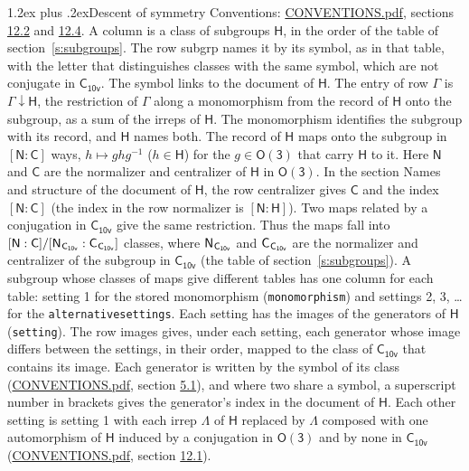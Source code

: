 \documentclass[10pt,a4paper]{article}
\makeatletter
\renewcommand\section{\@startsection{section}{1}{\z@}{-3ex plus -1ex minus -.2ex}%
  {1.2ex plus .2ex}{\normalfont\large\sffamily\bfseries\color{parttitle}}}
\numberwithin{equation}{section}
\newcommand{\grp}[1]{\mathsf{#1}}
\newcommand{\grpindex}[2]{[#1 : #2]}
\newcommand{\restr}[2]{#1\!\downarrow#2}
\newcommand{\hairsp}{\mkern1mu}
\makeatother
\begin{document}
\section{Descent of symmetry}\label{s:subduction}
Conventions: \href{../../CONVENTIONS.pdf}{CONVENTIONS.pdf}, sections \href{../../CONVENTIONS.pdf\#conv.12.2}{12.2} and \href{../../CONVENTIONS.pdf\#conv.12.4}{12.4}.
A column is a class of subgroups $\grp{H}$, in the order of the table of section~\ref{s:subgroups}. The row subgrp names it by its symbol, as in that table, with the letter that distinguishes classes with the same symbol, which are not conjugate in $\grp{C_{10v}}$. The symbol links to the document of $\grp{H}$. The entry of row $\Gamma$ is $\restr{\Gamma}{\grp{H}}$, the restriction of $\Gamma$ along a monomorphism from the record of $\grp{H}$ onto the subgroup, as a sum of the irreps of $\grp{H}$. The monomorphism identifies the subgroup with its record, and $\grp{H}$ names both. \label{n:group.normalizer.o3}\label{n:group.centralizer.o3}The record of $\grp{H}$ maps onto the subgroup in $\grpindex{\grp{N}}{\grp{C}}$ ways, $h \mapsto g h g^{-1}$ ($h \in \grp{H}$) for the $g \in \grp{O(3)}$ that carry $\grp{H}$ to it. Here $\grp{N}$ and $\grp{C}$ are the normalizer and centralizer of $\grp{H}$ in \href{O3.pdf}{$\grp{O(3)}$}. In the section Names and structure of the document of $\grp{H}$, the row centralizer gives $\grp{C}$ and the index $\grpindex{\grp{N}}{\grp{C}}$ (the index in the row normalizer is $\grpindex{\grp{N}}{\grp{H}}$). Two maps related by a conjugation in $\grp{C_{10v}}$ give the same restriction. Thus the maps fall into $\grpindex{\grp{N}}{\grp{C}}/\grpindex{\grp{N}_{\hairsp \grp{C_{10v}}}}{\grp{C}_{\hairsp \grp{C_{10v}}}}$ classes, where $\grp{N}_{\hairsp \grp{C_{10v}}}$ and $\grp{C}_{\hairsp \grp{C_{10v}}}$ are the normalizer and centralizer of the subgroup in $\grp{C_{10v}}$ (the table of section~\ref{s:subgroups}). \label{n:head.setting}A subgroup whose classes of maps give different tables has one column for each table: setting 1 for the stored monomorphism (\texttt{monomorphism}) and settings 2, 3, \dots{} for the \texttt{alternativesettings}. Each setting has the images of the generators of $\grp{H}$ (\texttt{setting}). \label{n:head.images}The row images gives, under each setting, each generator whose image differs between the settings, in their order, mapped to the class of $\grp{C_{10v}}$ that contains its image. Each generator is written by the symbol of its class (\href{../../CONVENTIONS.pdf}{CONVENTIONS.pdf}, section \href{../../CONVENTIONS.pdf\#conv.5.1}{5.1}), and where two share a symbol, a superscript number in brackets gives the generator's index in the document of $\grp{H}$. \label{n:irrep.Delta}Each other setting is setting 1 with each irrep $\Lambda$ of $\grp{H}$ replaced by $\Lambda$ composed with one automorphism of $\grp{H}$ induced by a conjugation in \href{O3.pdf}{$\grp{O(3)}$} and by none in $\grp{C_{10v}}$ (\href{../../CONVENTIONS.pdf}{CONVENTIONS.pdf}, section \href{../../CONVENTIONS.pdf\#conv.12.1}{12.1}).
\end{document}

